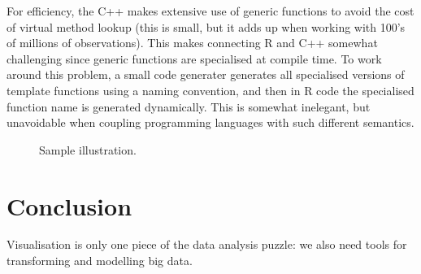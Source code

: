 \documentclass[journal]{vgtc}                %
\begin{document}
For efficiency, the C++ makes extensive use of generic functions to avoid the cost of virtual method lookup (this is small, but it adds up when working with 100's of millions of observations).  This makes connecting R and C++ somewhat challenging since generic functions are specialised at compile time. To work around this problem, a small code generater generates all specialised versions of template functions using a naming convention, and then in R code the specialised function name is generated dynamically.  This is somewhat inelegant, but unavoidable when coupling programming languages with such different semantics.


% 

\begin{figure}[htb]
 \centering
 \caption{Sample illustration.}
\end{figure}

\section{Conclusion}
\label{sec:conclusion}

Visualisation is only one piece of the data analysis puzzle: we also need tools for transforming and modelling big data. 



\newpage

\end{document}
